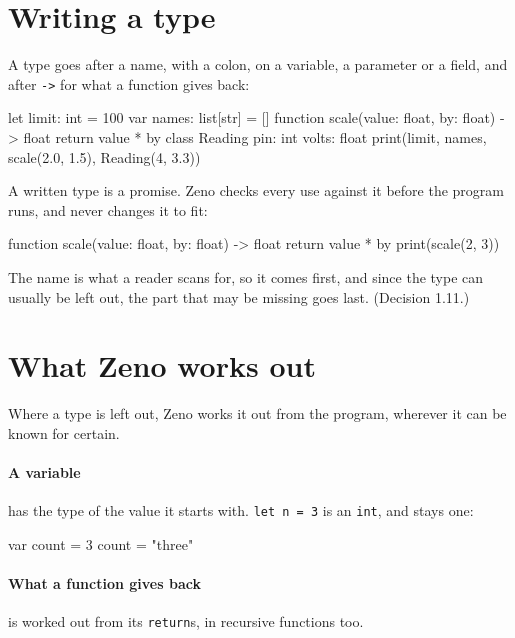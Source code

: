 \section{Writing a type}

A type goes after a name, with a colon, on a variable, a parameter or
a field, and after \verb|->| for what a function gives back:

\begin{zeno}
let limit: int = 100
var names: list[str] = []
function scale(value: float, by: float) -> float {
    return value * by
}
class Reading {
    pin: int
    volts: float
}
print(limit, names, scale(2.0, 1.5), Reading(4, 3.3))
\end{zeno}

A written type is a promise. Zeno checks every use against it before
the program runs, and never changes it to fit:

\begin{zeno}[fails=yes]
function scale(value: float, by: float) -> float {
    return value * by
}
print(scale(2, 3))
\end{zeno}

\begin{why}
The name is what a reader scans for, so it comes first, and since the
type can usually be left out, the part that may be missing goes last.
(Decision 1.11.)
\end{why}

\section{What Zeno works out}

Where a type is left out, Zeno works it out from the program, wherever
it can be known for certain.

\paragraph{A variable} has the type of the value it starts with.
\verb|let n = 3| is an \verb|int|, and stays one:

\begin{zeno}[fails=yes]
var count = 3
count = "three"
\end{zeno}

\paragraph{What a function gives back} is worked out from its
\verb|return|s, in recursive functions too.

